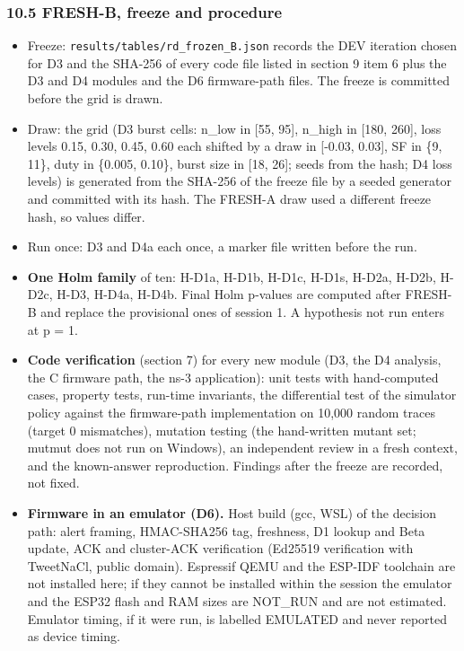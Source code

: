 \subsubsection*{10.5 FRESH-B, freeze and procedure}
\begin{itemize}
\item Freeze: \texttt{results/tables/rd\_frozen\_B.json} records the DEV iteration chosen for D3 and the SHA-256 of every code file listed in section 9 item 6 plus the D3 and D4 modules and the D6 firmware-path files. The freeze is committed before the grid is drawn.
\item Draw: the grid (D3 burst cells: n\_low in [55, 95], n\_high in [180, 260], loss levels 0.15, 0.30, 0.45, 0.60 each shifted by a draw in [-0.03, 0.03], SF in \{9, 11\}, duty in \{0.005, 0.10\}, burst size in [18, 26]; seeds from the hash; D4 loss levels) is generated from the SHA-256 of the freeze file by a seeded generator and committed with its hash. The FRESH-A draw used a different freeze hash, so values differ.
\item Run once: D3 and D4a each once, a marker file written before the run.
\item \textbf{One Holm family} of ten: H-D1a, H-D1b, H-D1c, H-D1s, H-D2a, H-D2b, H-D2c, H-D3, H-D4a, H-D4b. Final Holm p-values are computed after FRESH-B and replace the provisional ones of session 1. A hypothesis not run enters at p = 1.
\item \textbf{Code verification} (section 7) for every new module (D3, the D4 analysis, the C firmware path, the ns-3 application): unit tests with hand-computed cases, property tests, run-time invariants, the differential test of the simulator policy against the firmware-path implementation on 10,000 random traces (target 0 mismatches), mutation testing (the hand-written mutant set; mutmut does not run on Windows), an independent review in a fresh context, and the known-answer reproduction. Findings after the freeze are recorded, not fixed.
\item \textbf{Firmware in an emulator (D6).} Host build (gcc, WSL) of the decision path: alert framing, HMAC-SHA256 tag, freshness, D1 lookup and Beta update, ACK and cluster-ACK verification (Ed25519 verification with TweetNaCl, public domain). Espressif QEMU and the ESP-IDF toolchain are not installed here; if they cannot be installed within the session the emulator and the ESP32 flash and RAM sizes are NOT\_RUN and are not estimated. Emulator timing, if it were run, is labelled EMULATED and never reported as device timing.
\end{itemize}

